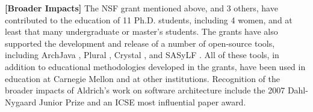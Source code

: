 \documentclass[11pt,letterpaper]{article}
\begin{document}
\textbf{[Broader Impacts]} The NSF grant mentioned above, and 3 others, have contributed to the education of 11 Ph.D. students, including 4 women, and at least that many undergraduate or master's students.  The grants have also supported the development and release of a number of open-source tools,
including ArchJava \cite{ArchJava}, Plural \cite{pluraltool}, Crystal \cite{Crystal}, and SASyLF
\cite{SASyLF}. All of these tools, in addition to educational methodologies developed in the grants, have been used in education at
Carnegie Mellon and at other institutions.  Recognition of the broader impacts of
Aldrich's work on software architecture include the 2007 Dahl-Nygaard
Junior Prize and an ICSE most influential paper award.


\listoftodos
\end{document}
